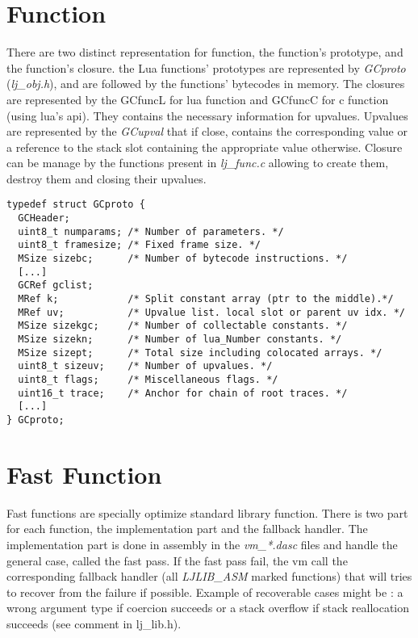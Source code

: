 
\section{Function}
\label{Sec:func}

There are two distinct representation for function, the function's prototype,
and the function's closure. the Lua functions' prototypes are represented by \emph{GCproto} (\emph{lj\_obj.h}), and are followed by the functions' bytecodes in memory.
The closures are represented by the GCfuncL for lua function and GCfuncC for
c function (using lua's api). They contains the necessary information for
upvalues. Upvalues are represented by the \emph{GCupval} that if close, contains
the corresponding value or a reference to the stack slot containing the
appropriate value otherwise. Closure can be manage by the functions present in
\emph{lj\_func.c} allowing to create them, destroy them and closing their
upvalues.

\begin{lstlisting}[style=CStyle]
typedef struct GCproto {
  GCHeader;
  uint8_t numparams; /* Number of parameters. */
  uint8_t framesize; /* Fixed frame size. */
  MSize sizebc;      /* Number of bytecode instructions. */
  [...]
  GCRef gclist;
  MRef k;            /* Split constant array (ptr to the middle).*/
  MRef uv;           /* Upvalue list. local slot or parent uv idx. */
  MSize sizekgc;     /* Number of collectable constants. */
  MSize sizekn;      /* Number of lua_Number constants. */
  MSize sizept;      /* Total size including colocated arrays. */
  uint8_t sizeuv;    /* Number of upvalues. */
  uint8_t flags;     /* Miscellaneous flags. */
  uint16_t trace;    /* Anchor for chain of root traces. */
  [...]
} GCproto;
\end{lstlisting}


\section{Fast Function}
\label{Sec:ffunc}

Fast functions are specially optimize standard library function. There is two
part for each function, the implementation part and the fallback handler.
The implementation part is done in assembly in the \emph{vm\_*.dasc} files and
handle the general case, called the fast pass. If the fast pass fail, the vm
call the corresponding fallback handler (all \emph{LJLIB\_ASM} marked functions)
that will tries to recover from the failure if possible. Example of recoverable
cases might be : a wrong argument type if coercion succeeds or a stack overflow
if stack reallocation succeeds (see comment in lj\_lib.h).
